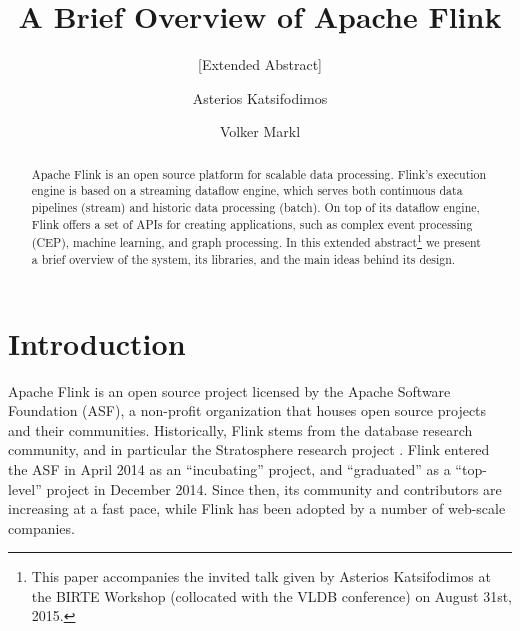 \documentclass{llncs}
\begin{document}
\mainmatter  %

\title{A Brief Overview of Apache Flink}
\subtitle{[Extended Abstract]}


%
%
\author{Asterios Katsifodimos \and Volker Markl}
%




%
%

\maketitle

\begin{abstract}
Apache Flink is an open source platform for scalable data processing. Flink's execution engine is based on a streaming dataflow engine, which serves both continuous data pipelines (stream) and historic data processing (batch). On top of its dataflow engine, Flink offers a set of APIs for creating applications, such as complex event processing (CEP), machine learning, and graph processing. In this extended abstract\footnote{This paper accompanies the invited talk given by Asterios Katsifodimos at the BIRTE Workshop (collocated with the VLDB conference) on August 31st, 2015.} we present a brief overview of the system, its libraries, and the main ideas behind its design.
\end{abstract}

\section{Introduction}
Apache Flink is an open source project licensed by the Apache Software Foundation (ASF), a non-profit organization that houses open source projects and their communities. Historically, Flink stems from the database research community, and in particular the Stratosphere research project \cite{stratosphere}. Flink entered the ASF in April 2014 as an “incubating” project, and “graduated” as a “top-level” project in December 2014. Since then, its community and contributors are increasing at  a fast pace, while Flink has been adopted by a number of web-scale companies.
\end{document}
